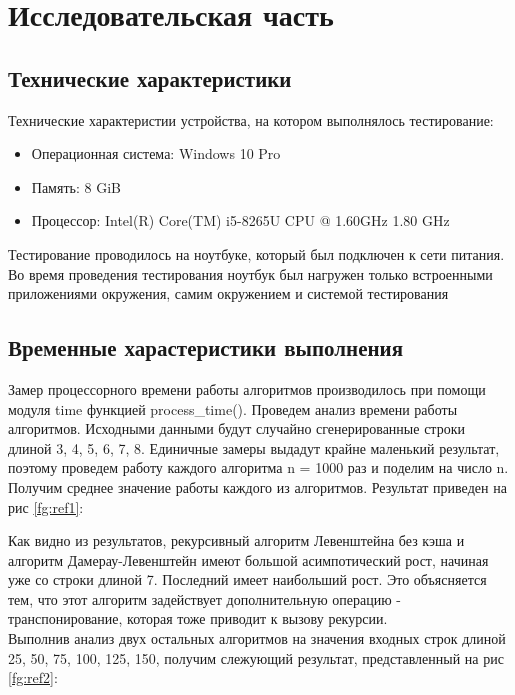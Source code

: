 \chapter{Исследовательская часть}
\section{Технические характеристики}
Технические характеристии устройства, на котором выполнялось тестирование:
\begin{itemize}
	\item Операционная система: Windows 10 Pro
	\item Память: 8 GiB
	\item Процессор: Intel(R) Core(TM) i5-8265U CPU @ 1.60GHz   1.80 GHz
\end{itemize}
Тестирование проводилось на ноутбуке, который был подключен к сети питания. Во время проведения тестирования ноутбук был нагружен только встроенными приложениями окружения, самим окружением и системой тестирования

\section{Временные харастеристики выполнения}
Замер процессорного времени работы алгоритмов производилось при помощи модуля time функцией process\_time().
Проведем анализ времени работы алгоритмов. Исходными данными будут случайно сгенерированные строки длиной {3, 4, 5, 6, 7, 8}. Единичные замеры выдадут крайне маленький результат, поэтому  проведем работу каждого алгоритма n = 1000 раз и поделим на число n. Получим среднее значение работы каждого из алгоритмов. Результат приведен на рис \ref{fg:ref1}:

\begin{figure}[ht!]
\end{figure} 

Как видно из результатов, рекурсивный алгоритм Левенштейна без кэша и алгоритм Дамерау-Левенштейн имеют большой асимпотический рост, начиная уже со строки длиной 7. Последний имеет наибольший рост. Это объясняется тем, что этот алгоритм задействует дополнительную операцию - транспонирование, которая тоже приводит к вызову рекурсии. \\
Выполнив анализ двух остальных алгоритмов на значения входных строк длиной {25, 50, 75, 100, 125, 150}, получим слежующий результат, представленный на рис \ref{fg:ref2}:
\begin{figure}[ht!]
\end{figure} 

